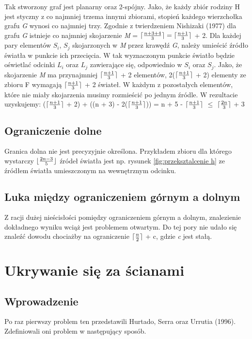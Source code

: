 \documentclass[brudnopis]{xmgr}
\DeclarePairedDelimiter\ceil{\lceil}{\rceil}
\DeclarePairedDelimiter\floor{\lfloor}{\rfloor}
\begin{document}
Tak stworzony graf jest planarny oraz 2-spójny. Jako, że każdy zbiór rodziny H jest styczny z co najmniej trzema innymi zbiorami, stopień każdego wierzchołka grafu \textit{G} wynosi co najmniej trzy. Zgodnie z twierdzeniem Nishizaki (1977) dla grafu \textit{G} istnieje co najmniej skojarzenie \textit{M} =  $\ceil{\frac{n+3+4}{3}} = \ceil{\frac{n+1}{3}}$  + 2. Dla każdej pary elementów $S_i$, $S_j$ skojarzonych w \textit{M} przez krawędź \textit{G}, należy umieścić źródło światła w punkcie ich przecięcia. W tak wyznaczonym punkcie światło będzie oświetlać odcinki $L_i$ oraz $L_j$ zawierające się, odpowiednio w $S_i$ oraz $S_j$. Jako, że skojarzenie \textit{M} ma przynajmniej $\ceil{\frac{n+1}{3}}$ + 2 elementów, 2($\ceil{\frac{n+1}{3}}$ + 2) elementy ze zbioru F wymagają $\ceil{\frac{n+1}{3}}$ + 2 świateł. W każdym z pozostałych elementów, które nie miały skojarzenia musimy rozmieścić po jednym źródle. W rezultacie uzyskujemy:
($\ceil{\frac{n+1}{3}}$ + 2) + ((n + 3) - 2($\ceil{\frac{n+1}{3}}$)) = n + 5 - $\ceil{\frac{n+1}{3}}$ $\le$ $\ceil{\frac{2n}{3}}$ + 3

\subsection{Ograniczenie dolne}
\indent Granica dolna nie jest precyzyjnie określona. Przykładem zbioru dla którego wystarczy $\floor{\frac{2n-3}{5}}$ źródeł światła jest np. rysunek \ref{fig:przeksztalcenie h} ze źródłem światła umieszczonym na wewnętrznym odcinku.

\subsection{Luka między ograniczeniem górnym a dolnym}
Z racji dużej nieścisłości pomiędzy ograniczeniem górnym a dolnym, znalezienie dokładnego wyniku wciąż jest problemem otwartym. Do tej pory nie udało się znaleźć dowodu chociażby na ograniczenie $\ceil{\frac{n}{2}}$ + c, gdzie \textit{c} jest stałą.

\section{Ukrywanie się za ścianami}
\subsection{Wprowadzenie}
Po raz pierwszy problem ten przedstawili Hurtado, Serra oraz Urrutia (1996). Zdefiniowali oni problem w następujący sposób.
\end{document}
